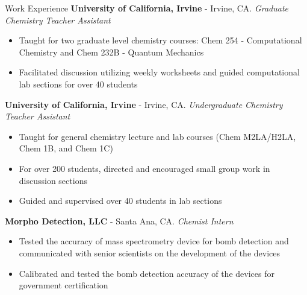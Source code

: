 \begin{rubric}{Work Experience}
  \textbf{University of California, Irvine} - Irvine, CA.
  \textit{Graduate Chemistry Teacher Assistant}
  \vspace{-0.5em}
  \begin{itemize}
    \itemsep-0.5em
  \item Taught for two graduate level chemistry courses:
    Chem 254 - Computational Chemistry and Chem 232B - Quantum Mechanics
  \item Facilitated discussion utilizing weekly worksheets and guided
    computational lab sections for over 40 students
  \vspace{-1em}
  \end{itemize}
%
  \textbf{University of California, Irvine} - Irvine, CA.
  \textit{Undergraduate Chemistry Teacher Assistant}
  \vspace{-0.5em}
  \begin{itemize}
    \itemsep-0.5em
  \item Taught for general chemistry lecture and lab courses (Chem M2LA/H2LA,
    Chem 1B, and Chem 1C)
  \item For over 200 students, directed and encouraged small group work in
    discussion sections
  \item Guided and supervised over 40 students in lab sections
  \vspace{-1em}
  \end{itemize}
%
  \textbf{Morpho Detection, LLC} - Santa Ana, CA.
  \textit{Chemist Intern}
  \vspace{-0.5em}
  \begin{itemize}
    \itemsep-0.5em
  \item Tested the accuracy of mass spectrometry device for bomb detection and communicated
    with senior scientists on the development of the devices
  \item Calibrated and tested the bomb detection accuracy of the devices for
    government certification
  \vspace{-2em}
  \end{itemize}
%
%
%
\end{rubric}

